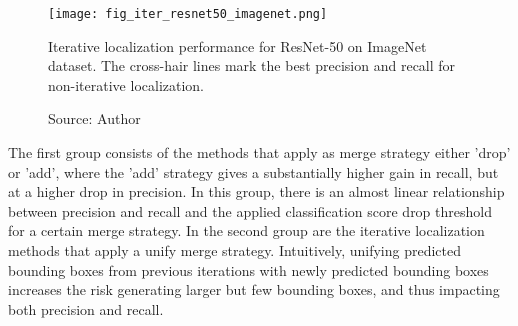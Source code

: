 \begin{figure}[h]
    \begin{center}       
    \texttt{[image: fig\_iter\_resnet50\_imagenet.png]}
    \caption[Iterative localization performance for ResNet-50 on ImageNet dataset]{Iterative localization performance for ResNet-50 on ImageNet dataset. The cross-hair lines mark the best precision and recall for non-iterative localization.}
    \caption*{Source: Author}
    \label{fig:prec_iter_resnet50_imagenet}
    \end{center}
\end{figure}

The first group consists of the methods that apply as merge strategy either 'drop' or 'add', where the 'add' strategy gives a substantially higher gain in recall, but at a higher drop in precision. In this group, there is an almost linear relationship between precision and recall and the applied classification score drop threshold for a certain merge strategy. In the second group are the iterative localization methods that apply a unify merge strategy. Intuitively, unifying predicted bounding boxes from previous iterations with newly predicted bounding boxes increases the risk generating larger but few bounding boxes, and thus impacting both precision and recall.

